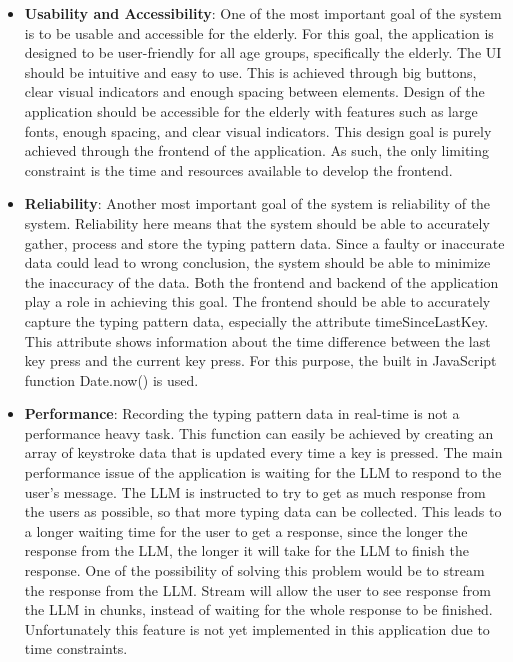 \begin{itemize} 
    \item \textbf{Usability and Accessibility}:
    One of the most important goal of the system is to be usable and accessible for the elderly.
    For this goal, the application is designed to be user-friendly for all age groups, specifically the elderly.
    The UI should be intuitive and easy to use.
    This is achieved through big buttons, clear visual indicators and enough spacing between elements.
    Design of the application should be accessible for the elderly with features such as large fonts, enough spacing, and clear visual indicators. 
    This design goal is purely achieved through the frontend of the application.
    As such, the only limiting constraint is the time and resources available to develop the frontend.

    \item \textbf{Reliability}: 
    Another most important goal of the system is reliability of the system.
    Reliability here means that the system should be able to accurately gather, process and store the typing pattern data.
    Since a faulty or inaccurate data could lead to wrong conclusion, the system should be able to minimize the inaccuracy of the data.
    Both the frontend and backend of the application play a role in achieving this goal.
    The frontend should be able to accurately capture the typing pattern data, especially the attribute timeSinceLastKey.
    This attribute shows information about the time difference between the last key press and the current key press.
    For this purpose, the built in JavaScript function Date.now() is used.

    \item \textbf{Performance}: 
    Recording the typing pattern data in real-time is not a performance heavy task.
    This function can easily be achieved by creating an array of keystroke data that is updated every time a key is pressed.
    The main performance issue of the application is waiting for the \ac{LLM} to respond to the user's message.
    The \ac{LLM} is instructed to try to get as much response from the users as possible, so that more typing data can be collected.
    This leads to a longer waiting time for the user to get a response, since the longer the response from the \ac{LLM}, the longer it will take for the \ac{LLM} to finish the response.
    One of the possibility of solving this problem would be to stream the response from the \ac{LLM}.
    Stream will allow the user to see response from the \ac{LLM} in chunks, instead of waiting for the whole response to be finished.
    Unfortunately this feature is not yet implemented in this application due to time constraints.


\end{itemize}
